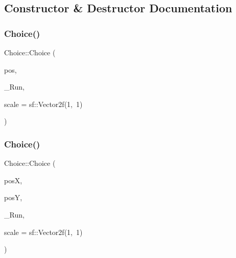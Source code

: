 \subsection{Constructor \& Destructor Documentation}
\mbox{\label{class_choice_a0ce837a0b3bc6b119b06163482fba415}} 
\subsubsection{\texorpdfstring{Choice()}{Choice()}\hspace{0.1cm}{\footnotesize\ttfamily [1/2]}}
{\footnotesize\ttfamily Choice\+::\+Choice (\begin{DoxyParamCaption}\item[{sf\+::\+Vector2f}]{pos,  }\item[{std\+::function$<$ \hyperlink{_globals_8h_a3d5776bab98402b03be09156bacf4f68}{Screens}(const sf\+::\+Render\+Target \&, \hyperlink{class_game__window}{Game\+\_\+window} \&)$>$}]{\+\_\+\+Run,  }\item[{sf\+::\+Vector2f}]{scale = {\ttfamily sf\+:\+:Vector2f(1,~1)} }\end{DoxyParamCaption})}

\mbox{\label{class_choice_afc2877f32cc760f96f33d0a12a0c0911}} 
\subsubsection{\texorpdfstring{Choice()}{Choice()}\hspace{0.1cm}{\footnotesize\ttfamily [2/2]}}
{\footnotesize\ttfamily Choice\+::\+Choice (\begin{DoxyParamCaption}\item[{float}]{posX,  }\item[{float}]{posY,  }\item[{std\+::function$<$ \hyperlink{_globals_8h_a3d5776bab98402b03be09156bacf4f68}{Screens}(const sf\+::\+Render\+Target \&, \hyperlink{class_game__window}{Game\+\_\+window} \&)$>$}]{\+\_\+\+Run,  }\item[{sf\+::\+Vector2f}]{scale = {\ttfamily sf\+:\+:Vector2f(1,~1)} }\end{DoxyParamCaption})}

\mbox{\label{class_choice_ac60418c9d38713ccef3cb0dd1f14a083}} 
